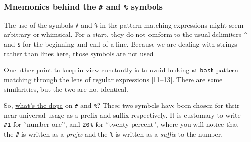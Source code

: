 \documentclass[
  a4paper,
]{article}
\newenvironment{Shaded}{\begin{snugshade}}{\end{snugshade}}
\newcommand{\BuiltInTok}[1]{\textcolor[rgb]{0.80,0.80,0.80}{#1}}
\newcommand{\CommentTok}[1]{\textcolor[rgb]{0.50,0.62,0.50}{#1}}
\newcommand{\NormalTok}[1]{\textcolor[rgb]{0.80,0.80,0.80}{#1}}
\newcommand{\OperatorTok}[1]{\textcolor[rgb]{0.94,0.94,0.82}{#1}}
\newcommand{\PreprocessorTok}[1]{\textcolor[rgb]{1.00,0.81,0.69}{\textbf{#1}}}
\newcommand{\StringTok}[1]{\textcolor[rgb]{0.80,0.58,0.58}{#1}}
\newcommand{\VariableTok}[1]{\textcolor[rgb]{0.80,0.80,0.80}{#1}}
\begin{document}
\begin{Shaded}
\end{Shaded}

\hypertarget{mnemonics-behind-the-and-symbols}{%
\subsubsection{\texorpdfstring{Mnemonics behind the \texttt{\#} and
\texttt{\%}
symbols}{Mnemonics behind the \# and \% symbols}}\label{mnemonics-behind-the-and-symbols}}

The use of the symbols \texttt{\#} and \texttt{\%} in the pattern
matching expressions might seem arbitrary or whimsical. For a start,
they do not conform to the usual delimiters \texttt{\^{}} and
\texttt{\$} for the beginning and end of a line. Because we are dealing
with strings rather than lines here, those symbols are not used.

One other point to keep in view constantly is to avoid looking at
\texttt{bash} pattern matching through the lens of
\href{https://www.regular-expressions.info/tutorial.html}{regular
expressions}
{[}\protect\hyperlink{ref-posixcharclass}{11}--\protect\hyperlink{ref-writeregexp}{13}{]}.
There are some similarities, but the two are not identical.

So,
\href{https://www.ldoceonline.com/dictionary/the-dope-on-somebody-something}{what's
the dope} on \texttt{\#} and \texttt{\%}? These two symbols have been
chosen for their near universal usage as a prefix and suffix
respectively. It is customary to write \texttt{\#1} for ``number one'',
and \texttt{20\%} for ``twenty percent'', where you will notice that the
\texttt{\#} is written as a \emph{prefix} and the \texttt{\%} is written
as a \emph{suffix} to the number.
\end{document}
